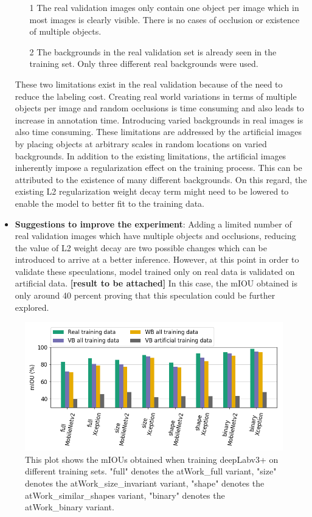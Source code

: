 \begin{itemize}
		\begin{itemize}
			\item[1] The real validation images only contain one object per image which in most images is clearly visible. There is no cases of occlusion or existence of multiple objects. 
			\item[2] The backgrounds in the real validation set is already seen in the training set. Only three different real backgrounds were used.
		\end{itemize}
		These two limitations exist in the real validation because of the need to reduce the labeling cost. Creating real world variations in terms of multiple objects per image and random occlusions is time consuming and also leads to increase in annotation time. Introducing varied backgrounds in real images is also time consuming. These limitations are addressed by the artificial images by placing objects at arbitrary scales in random locations on varied backgrounds.
		In addition to the existing limitations, the artificial images inherently impose a regularization effect on the training process. This can be attributed to the existence of many different backgrounds. On this regard, the existing L2 regularization weight decay term might need to be lowered to enable the model to better fit to the training data.
		\item \textbf{Suggestions to improve the experiment}: Adding a limited number of real validation images which have multiple objects and occlusions, reducing the value of L2 weight decay are two possible changes which can be introduced to arrive at a better inference. However, at this point in order to validate these speculations, model trained only on real data is validated on artificial data. \textbf{[result to be attached]} In this case, the mIOU obtained is only around 40 percent proving that this speculation could be further explored.
	\end{itemize}
	
	\begin{figure}
		\centering
		\includegraphics[width=1\linewidth]{images/real_val}
		\caption{This plot shows the mIOUs obtained when training deepLabv3+ on different training sets. "full" denotes the atWork\_full variant, "size" denotes the atWork\_size\_invariant variant, "shape" denotes the atWork\_similar\_shapes variant, "binary" denotes the atWork\_binary variant.}
		\label{Fig:realval}
	\end{figure}

